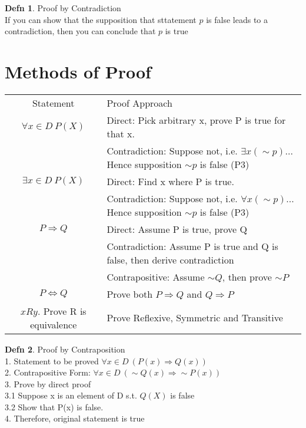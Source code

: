\documentclass[a4paper]{article}
\theoremstyle{definition}
\newtheorem*{defn}{Defn}
\begin{document}
\begin{defn}{Proof by Contradiction}\\ If you can show that the supposition that sttatement $p$ is false leads to a contradiction, then you can conclude that $p$ is true \end{defn}

\section{Methods of Proof}

\begin{tabular} {|c|l|}
  \hline
  Statement & Proof Approach \\
  $\forall x \in D\ P(X)$ & Direct: Pick arbitrary x, prove P is true for that x. \\
                    & Contradiction: Suppose not, i.e. $ \exists x(\sim p)$... Hence supposition $\sim p$ is false (P3) \\
  \hline
  $\exists x \in D\ P(X)$ & Direct: Find x where P is true. \\
                    & Contradiction: Suppose not, i.e. $\forall x (\sim p)$... Hence supposition $\sim p$ is false (P3) \\
  \hline
  $P \Rightarrow Q$ & Direct: Assume P is true, prove Q \\
                    & Contradiction: Assume P is true and Q is false, then derive contradiction \\
                    & Contrapositive: Assume $\sim Q$, then prove $\sim P$ \\
  \hline
  $P \Leftrightarrow Q$ & Prove both $P \Rightarrow Q$ and $Q \Rightarrow P$ \\
  \hline
  $xRy$. Prove R is equivalence  & Prove Reflexive, Symmetric and Transitive \\
  \hline

\end{tabular}

\begin{defn}{Proof by Contraposition}\\
  1. Statement to be proved $\forall x \in D\ (P(x) \Rightarrow Q(x))$\\
  2. Contrapositive Form: $\forall x \in D\ (\sim Q(x) \Rightarrow \sim P(x))$\\
  3. Prove by direct proof\\
  3.1 Suppose x is an element of D s.t. $Q(X)$ is false\\
  3.2 Show that P(x) is false.\\
  4. Therefore, original statement is true
\end{defn}
\end{document}
